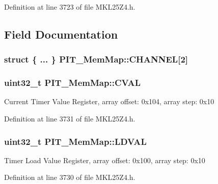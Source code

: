 Definition at line 3723 of file M\+K\+L25\+Z4.\+h.



\subsection{Field Documentation}
\subsubsection[{\texorpdfstring{C\+H\+A\+N\+N\+EL}{CHANNEL}}]{\setlength{\rightskip}{0pt plus 5cm}struct \{ ... \}   P\+I\+T\+\_\+\+Mem\+Map\+::\+C\+H\+A\+N\+N\+EL\mbox{[}2\mbox{]}}\hypertarget{struct_p_i_t___mem_map_a1648a77a9c87cd725a27fd73906c5c2b}{}\label{struct_p_i_t___mem_map_a1648a77a9c87cd725a27fd73906c5c2b}
\subsubsection[{\texorpdfstring{C\+V\+AL}{CVAL}}]{\setlength{\rightskip}{0pt plus 5cm}uint32\+\_\+t P\+I\+T\+\_\+\+Mem\+Map\+::\+C\+V\+AL}\hypertarget{struct_p_i_t___mem_map_a7d3d1a5913a28cfb4ca0e120ebf37087}{}\label{struct_p_i_t___mem_map_a7d3d1a5913a28cfb4ca0e120ebf37087}
Current Timer Value Register, array offset\+: 0x104, array step\+: 0x10 

Definition at line 3731 of file M\+K\+L25\+Z4.\+h.

\subsubsection[{\texorpdfstring{L\+D\+V\+AL}{LDVAL}}]{\setlength{\rightskip}{0pt plus 5cm}uint32\+\_\+t P\+I\+T\+\_\+\+Mem\+Map\+::\+L\+D\+V\+AL}\hypertarget{struct_p_i_t___mem_map_ad664bbe0f8b53ee1e533727db4da3fb2}{}\label{struct_p_i_t___mem_map_ad664bbe0f8b53ee1e533727db4da3fb2}
Timer Load Value Register, array offset\+: 0x100, array step\+: 0x10 

Definition at line 3730 of file M\+K\+L25\+Z4.\+h.

